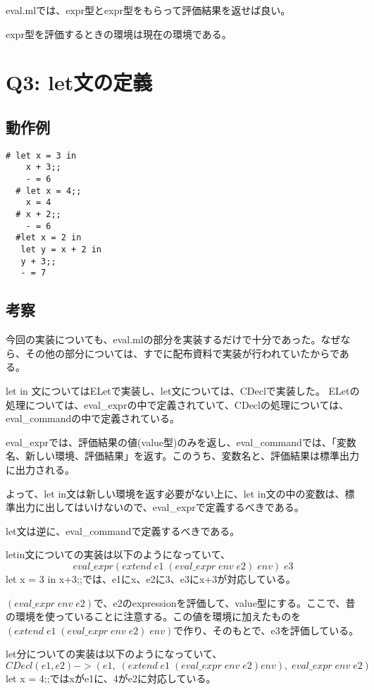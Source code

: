 \documentclass[uplatex,12pt]{jsarticle}
\begin{document}
eval.mlでは、expr型とexpr型をもらって評価結果を返せば良い。

expr型を評価するときの環境は現在の環境である。

\section{Q3: let文の定義}
\subsection{動作例}
\begin{lstlisting}[caption=動作例]
  # let x = 3 in
    x + 3;;
    - = 6
  # let x = 4;;
    x = 4
  # x + 2;;
    - = 6
  #let x = 2 in
   let y = x + 2 in
   y + 3;;
   - = 7
\end{lstlisting}

\subsection{考察}


今回の実装についても、eval.mlの部分を実装するだけで十分であった。なぜなら、その他の部分については、すでに配布資料で実装が行われていたからである。

let in 文についてはELetで実装し、let文については、CDeclで実装した。
ELetの処理については、eval\_exprの中で定義されていて、CDeclの処理については、eval\_commandの中で定義されている。

eval\_exprでは、評価結果の値(value型)のみを返し、eval\_commandでは、「変数名、新しい環境、評価結果」を返す。このうち、変数名と、評価結果は標準出力に出力される。

よって、let in文は新しい環境を返す必要がない上に、let in文の中の変数は、標準出力に出してはいけないので、eval\_exprで定義するべきである。

let文は逆に、eval\_commandで定義するべきである。

letin文についての実装は以下のようになっていて、
$$eval\_expr (extend \; e1 \; (eval\_expr  \; env \; e2) \; env) \;e3$$
let x = 3 in x+3;;では、e1にx、e2に3、e3にx+3が対応している。

$(eval\_expr \; env \; e2)$で、e2のexpressionを評価して、value型にする。ここで、昔の環境を使っていることに注意する。この値を環境に加えたものを$(extend \; e1 \; (eval\_expr  \; env \; e2) \; env)$で作り、そのもとで、e3を評価している。

let分についての実装は以下のようになっていて、
$$ CDecl (e1,e2) -> (e1,\; (extend \; e1 \;(eval\_expr \; env \; e2) env),\; eval\_expr \; env \; e2)$$
let x = 4;;ではxがe1に、4がe2に対応している。
\end{document}
